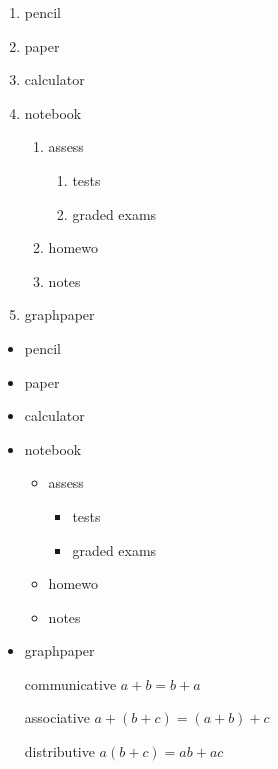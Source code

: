 \documentclass[12pt]{article}
\begin{document}
\begin{enumerate}
\item pencil 
\item paper
\item calculator
\item notebook
	\begin{enumerate}
	\item assess
		\begin{enumerate}
			\item tests
			\item graded exams
		\end{enumerate}
	\item homewo
	\item notes
	\end{enumerate}
\item graphpaper
\end{enumerate}

\begin{itemize}
\item pencil 
\item paper
\item calculator
\item notebook
	\begin{itemize}
		\item assess
		\begin{itemize}
			\item tests
			\item graded exams
		\end{itemize}
	\item homewo
	\item notes
	\end{itemize}
\item graphpaper
\end{itemize} 	

\begin{enumerate}
\item[communicative] $a+b=b+a$
\item[associative] $a+(b+c)=(a+b)+c$
\item[distributive] $a(b+c)=ab+ac$
\end{enumerate}
\end{document}
